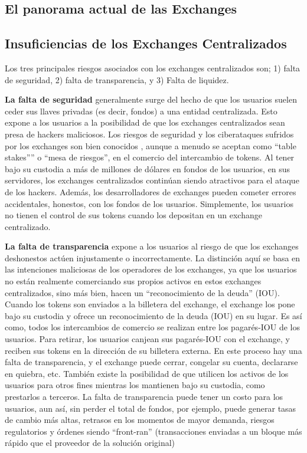 \documentclass[UTF8,nofonts]{article}
\begin{document}
\begin{multicols}{2}
\section{El panorama actual de las Exchanges\label{sec:current_exchange_landscape}}

\subsection{Insuficiencias de los Exchanges Centralizados}
Los tres principales riesgos asociados con los exchanges centralizados son; 1) falta de seguridad, 2) falta de transparencia, y 3) Falta de liquidez.

\textbf{La falta de seguridad} generalmente surge del hecho de que los usuarios suelen ceder sus llaves privadas (es decir, fondos) a una entidad centralizada. Esto expone a los usuarios a la posibilidad de que los exchanges centralizados sean presa de hackers maliciosos. Los riesgos de seguridad y los ciberataques sufridos por los exchanges son bien conocidos \cite{coincheckhack}  \cite{mcmillan2014inside}, aunque a menudo se aceptan como \enquote{table stakes”} o \enquote{mesa de riesgos}, en el comercio del intercambio de tokens.
    Al tener bajo su custodia a m\'as de millones de d\'olares en fondos de los usuarios, en sus servidores, los exchanges centralizados contin\'uan siendo atractivos para el ataque de los hackers. Adem\'as, los desarrolladores de exchanges pueden cometer errores accidentales, honestos, con los fondos de los usuarios. Simplemente, los usuarios no tienen el control de sus tokens cuando los depositan en un exchange centralizado.

\textbf{La falta de transparencia} expone a los usuarios al riesgo de que los exchanges deshonestos act\'uen injustamente o incorrectamente. La distinci\'on aqu\'i se basa en las intenciones maliciosas de los operadores de los exchanges, ya que los usuarios no est\'an realmente comerciando sus propios activos en estos exchanges centralizados, sino m\'as bien, hacen un \enquote{reconocimiento de la deuda} (IOU). Cuando los tokens son enviados a la billetera del exchange, el exchange los pone bajo su custodia y ofrece un reconocimiento de la deuda (IOU) en su lugar. Es as\'i como, todos los intercambios de comercio se realizan entre los pagar\'es-IOU de los usuarios. Para retirar, los usuarios canjean sus pagar\'es-IOU con el exchange, y reciben sus tokens en la direcci\'on de su billetera externa. En este proceso hay una falta de transparencia, y el exchange puede cerrar, congelar su cuenta, declararse en quiebra, etc. Tambi\'en existe la posibilidad de que utilicen los activos de los usuarios para otros fines mientras los mantienen bajo su custodia, como prestarlos a terceros. La falta de transparencia puede tener un costo para los usuarios, aun as\'i, sin perder el total de fondos, por ejemplo, puede generar tasas de cambio m\'as altas, retrasos en los momentos de mayor demanda, riesgos regulatorios y \'ordenes siendo “front-ran” (transacciones enviadas a un bloque m\'as r\'apido que el proveedor de la soluci\'on original)


\end{multicols}
\end{document}

